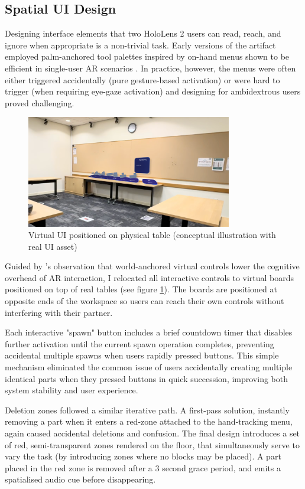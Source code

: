 \subsection{Spatial UI Design}
Designing interface elements that two HoloLens 2 users can read, reach, and ignore when appropriate is a non-trivial task. Early versions of the artifact employed palm-anchored tool palettes inspired by on-hand menus shown to be efficient in single-user AR scenarios \cite{azai2018openPalm}. In practice, however, the menus were often either triggered accidentally (pure gesture-based activation) or were hard to trigger (when requiring eye-gaze activation) and designing for ambidextrous users proved challenging.

\begin{figure}[h]
    \centering
    \includegraphics[width=0.8\textwidth]{assets/04/menu-in-room.png}
    \caption{Virtual UI positioned on physical table (conceptual illustration with real UI asset)}
    \label{fig:menu-in-room}
\end{figure}

Guided by \cite{billinghurst2005designing}'s observation that world-anchored virtual controls lower the cognitive overhead of AR interaction, I relocated all interactive controls to virtual boards positioned on top of real tables (see figure \ref{fig:menu-in-room}). The boards are positioned at opposite ends of the workspace so users can reach their own controls without interfering with their partner.

Each interactive "spawn" button includes a brief countdown timer that disables further activation until the current spawn operation completes, preventing accidental multiple spawns when users rapidly pressed buttons. This simple mechanism eliminated the common issue of users accidentally creating multiple identical parts when they pressed buttons in quick succession, improving both system stability and user experience.

Deletion zones followed a similar iterative path. A first-pass solution, instantly removing a part when it enters a red-zone attached to the hand-tracking menu, again caused accidental deletions and confusion. The final design introduces a set of red, semi-transparent zones rendered on the floor, that simultaneously serve to vary the task (by introducing zones where no blocks may be placed). A part placed in the red zone is removed after a 3 second grace period, and emits a spatialised audio cue before disappearing.

